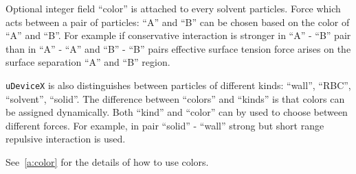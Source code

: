 Optional integer field ``color'' is attached to every solvent
particles. Force which acts between a pair of particles: ``A'' and
``B'' can be chosen based on the color of ``A'' and ``B''. For
example if conservative interaction is stronger in ``A'' - ``B'' pair
than in ``A'' - ``A'' and ``B'' - ``B'' pairs effective surface
tension force arises on the surface separation ``A'' and ``B''
region.

\texttt{uDeviceX} is also distinguishes between particles of different
kinds: ``wall'', ``RBC'', ``solvent'', ``solid''. The difference
between ``colors'' and ``kinds'' is that colors can be assigned
dynamically. Both ``kind'' and ``color'' can by used to choose between
different forces. For example, in pair ``solid'' - ``wall'' strong but
short range repulsive interaction is used.

See~\ref{a:color} for the details of how to use colors.
